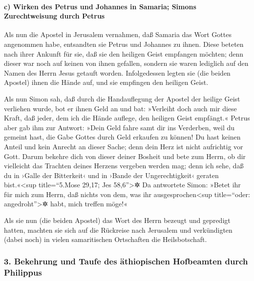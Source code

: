 \hypertarget{c-wirken-des-petrus-und-johannes-in-samaria-simons-zurechtweisung-durch-petrus}{%
\paragraph{c) Wirken des Petrus und Johannes in Samaria; Simons
Zurechtweisung durch
Petrus}\label{c-wirken-des-petrus-und-johannes-in-samaria-simons-zurechtweisung-durch-petrus}}

 Als nun die Apostel in Jerusalem vernahmen, daß Samaria
das Wort Gottes angenommen habe, entsandten sie Petrus und Johannes zu
ihnen.  Diese beteten nach ihrer Ankunft für sie, daß sie
den heiligen Geist empfangen möchten;  denn dieser war
noch auf keinen von ihnen gefallen, sondern sie waren lediglich auf den
Namen des Herrn Jesus getauft worden.  Infolgedessen
legten sie (die beiden Apostel) ihnen die Hände auf, und sie empfingen
den heiligen Geist.

 Als nun Simon sah, daß durch die Handauflegung der
Apostel der heilige Geist verliehen wurde, bot er ihnen Geld an
 und bat: »Verleiht doch auch mir diese Kraft, daß jeder,
dem ich die Hände auflege, den heiligen Geist empfängt.« 
Petrus aber gab ihm zur Antwort: »Dein Geld fahre samt dir ins
Verderben, weil du gemeint hast, die Gabe Gottes durch Geld erkaufen zu
können!  Du hast keinen Anteil und kein Anrecht an dieser
Sache; denn dein Herz ist nicht aufrichtig vor Gott. 
Darum bekehre dich von dieser deiner Bosheit und bete zum Herrn, ob dir
vielleicht das Trachten deines Herzens vergeben werden mag;
 denn ich sehe, daß du in ›Galle der Bitterkeit‹ und in
›Bande der Ungerechtigkeit‹ geraten bist.«\textless sup title=``5.Mose
29,17; Jes 58,6''\textgreater✲  Da antwortete Simon:
»Betet ihr für mich zum Herrn, daß nichts von dem, was ihr
ausgesprochen\textless sup title=``oder: angedroht''\textgreater✲ habt,
mich treffen möge!«

 Als sie nun (die beiden Apostel) das Wort des Herrn
bezeugt und gepredigt hatten, machten sie sich auf die Rückreise nach
Jerusalem und verkündigten (dabei noch) in vielen samaritischen
Ortschaften die Heilsbotschaft.

\hypertarget{bekehrung-und-taufe-des-uxe4thiopischen-hofbeamten-durch-philippus}{%
\subsubsection{3. Bekehrung und Taufe des äthiopischen Hofbeamten durch
Philippus}\label{bekehrung-und-taufe-des-uxe4thiopischen-hofbeamten-durch-philippus}}

